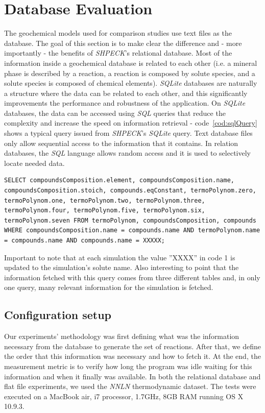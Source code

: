\section{Database Evaluation}
The geochemical models used for comparison studies use text files as the database. The goal of this section is to make clear the difference and - more importantly - the benefits of \emph{SHPECK}'s relational database. Most of the information inside a geochemical database is related to each other (i.e. a mineral phase is described by a reaction, a reaction is composed by solute species, and a solute species is composed of chemical elements). \emph{SQLite} databases are naturally a structure where the data can be related to each other, and this significantly improvements the performance and robustness of the application. On \emph{SQLite} databases, the data can be accessed using \emph{SQL} queries that reduce the complexity and increase the speed on information retrieval - code~\ref{cod:sqlQuery} shows a typical query issued from \emph{SHPECK}'s \emph{SQLite} query. Text database files only allow sequential access to the information that it contains. In relation databases, the \emph{SQL} language allows random access and it  is used to selectively locate needed data.


\begin{minipage}{0.8\linewidth}
\begin{lstlisting}[frame=single, label=cod:sqlQuery, caption=\emph{SHPECK}'s \emph{SQLite} example query]
SELECT compoundsComposition.element, compoundsComposition.name, compoundsComposition.stoich, compounds.eqConstant, termoPolynom.zero, termoPolynom.one, termoPolynom.two, termoPolynom.three, termoPolynom.four, termoPolynom.five, termoPolynom.six, termoPolynom.seven FROM termoPolynom, compoundsComposition, compounds WHERE compoundsComposition.name = compounds.name AND termoPolynom.name = compounds.name AND compounds.name = XXXXX;
\end{lstlisting}
\end{minipage}

Important to note that at each simulation the value ”XXXX” in code 1 is updated to the simulation’s solute name. Also interesting to point that the information fetched with this query comes from three different tables and, in only one query, many relevant information for the simulation is fetched.

\subsection{Configuration setup}
Our experiments' methodology was first defining what was the information necessary from the database to generate the set of reactions. After that, we define the order that this information was necessary and how to fetch it. At the end, the measurement metric is to verify how long the program was idle waiting for this information and when it finally was available. In both the relational database and flat file experiments, we used the \emph{NNLN} thermodynamic dataset.
The tests were executed on a MacBook air, i7 processor, 1.7GHz, 8GB RAM running OS X 10.9.3.

